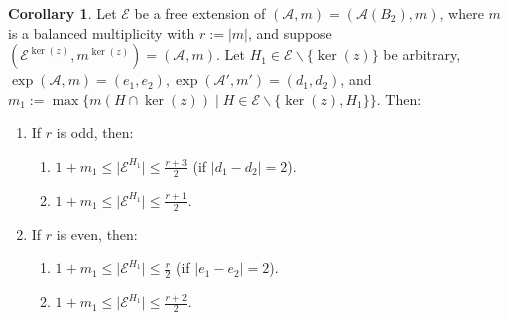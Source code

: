 \documentclass[12pt]{amsart}
\theoremstyle{definition}
\newtheorem{corollary}[theorem]{Corollary}
\theoremstyle{remark}
\newcommand\CA{{\mathscr A}}
\newcommand\CE{{\mathscr E}}
\begin{document}
\begin{corollary}\label{corollary: restriction on amount of hyperplanes for extension of B2}
    Let $\CE$ be a free extension of $(\CA,m)=(\CA(B_2),m)$, where $m$ is a balanced multiplicity with $r:=\vert m\vert$, and suppose $(\CE^{\ker(z)},m^{\ker(z)})=(\CA,m)$. Let $H_1\in\CE\backslash\{\ker(z)\}$ be arbitrary, $\exp(\CA,m)=(e_1,e_2), \exp(\CA',m')=(d_1,d_2)$, and $m_1:=\max\{m(H\cap \ker(z))\mid H\in\CE\backslash\{\ker(z),H_1\}\}$. Then:
    \begin{enumerate}
        \item If $r$ is odd, then: 
        \begin{enumerate}
            \item $1+m_1\leq \vert \CE^{H_1}\vert\leq \frac{r+3}{2}$ (if $\vert d_1-d_2\vert=2$).
            \item $1+m_1\leq \vert \CE^{H_1}\vert\leq \frac{r+1}{2}$.
        \end{enumerate} 
        \item If $r$ is even, then: 
        \begin{enumerate}
            \item $1+m_1\leq \vert\CE^{H_1}\vert\leq \frac{r}{2}$ (if $\vert e_1-e_2\vert=2$).
            \item $1+m_1 \leq \vert\CE^{H_1}\vert\leq \frac{r+2}{2}$.
        \end{enumerate} 
    \end{enumerate}
\end{corollary}
\end{document}
